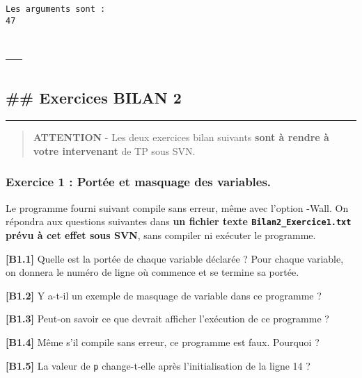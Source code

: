 \documentclass[11pt]{article}
\begin{document}
    \begin{Verbatim}[commandchars=\\\{\}]
Les arguments sont :
47
    \end{Verbatim}

    \hypertarget{section}{%
\subsection{---}\label{section}}

\hypertarget{exercices-bilan-2}{%
\subsection{\#\# Exercices BILAN 2}\label{exercices-bilan-2}}

\begin{center}\rule{0.5\linewidth}{0.5pt}\end{center}

\begin{quote}
\textbf{ATTENTION} - Les deux exercices bilan suivants \textbf{sont à
rendre à votre intervenant} de TP sous SVN.
\end{quote}

    \hypertarget{exercice-1-portuxe9e-et-masquage-des-variables.}{%
\subsubsection{Exercice 1 : Portée et masquage des
variables.}\label{exercice-1-portuxe9e-et-masquage-des-variables.}}

Le programme fourni suivant compile sans erreur, même avec l'option
-Wall. On répondra aux questions suivantes dans \textbf{un fichier texte
\texttt{Bilan2\_Exercice1.txt} prévu à cet effet sous SVN}, sans
compiler ni exécuter le programme.

    \textbf{{[}B1.1{]}} Quelle est la portée de chaque variable déclarée ?
Pour chaque variable, on donnera le numéro de ligne où commence et se
termine sa portée.

\textbf{{[}B1.2{]}} Y a-t-il un exemple de masquage de variable dans ce
programme ?

\textbf{{[}B1.3{]}} Peut-on savoir ce que devrait afficher l'exécution
de ce programme ?

\textbf{{[}B1.4{]}} Même s'il compile sans erreur, ce programme est
faux. Pourquoi ?

\textbf{{[}B1.5{]}} La valeur de \texttt{p} change-t-elle après
l'initialisation de la ligne 14 ?
\end{document}
